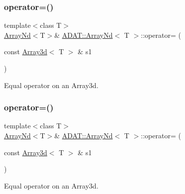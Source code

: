 \subsubsection{\texorpdfstring{operator=()}{operator=()}\hspace{0.1cm}{\footnotesize\ttfamily [11/15]}}
{\footnotesize\ttfamily template$<$class T$>$ \\
\mbox{\hyperlink{classADAT_1_1ArrayNd}{Array\+Nd}}$<$T$>$\& \mbox{\hyperlink{classADAT_1_1ArrayNd}{A\+D\+A\+T\+::\+Array\+Nd}}$<$ T $>$\+::operator= (\begin{DoxyParamCaption}\item[{const \mbox{\hyperlink{classXMLArray_1_1Array3d}{Array3d}}$<$ T $>$ \&}]{s1 }\end{DoxyParamCaption})\hspace{0.3cm}{\ttfamily [inline]}}



Equal operator on an Array3d. 

\mbox{\label{classADAT_1_1ArrayNd_aa02a148fb7073245d21688eaa40d820b}} 
\subsubsection{\texorpdfstring{operator=()}{operator=()}\hspace{0.1cm}{\footnotesize\ttfamily [12/15]}}
{\footnotesize\ttfamily template$<$class T$>$ \\
\mbox{\hyperlink{classADAT_1_1ArrayNd}{Array\+Nd}}$<$T$>$\& \mbox{\hyperlink{classADAT_1_1ArrayNd}{A\+D\+A\+T\+::\+Array\+Nd}}$<$ T $>$\+::operator= (\begin{DoxyParamCaption}\item[{const \mbox{\hyperlink{classXMLArray_1_1Array3d}{Array3d}}$<$ T $>$ \&}]{s1 }\end{DoxyParamCaption})\hspace{0.3cm}{\ttfamily [inline]}}



Equal operator on an Array3d. 

\mbox{\label{classADAT_1_1ArrayNd_a4b2d8a768beccefe12844f27c50b058b}} 
